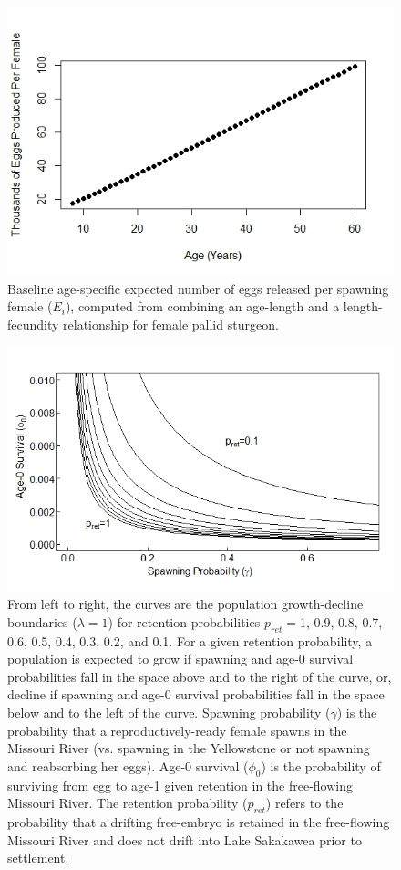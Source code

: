 \documentclass[12pt]{article}
\begin{document}
\begin{figure}[h]
\centering
\includegraphics[width=6in]{NEPA_fig_6-eggs}
\caption{Baseline age-specific expected number of eggs released per spawning female ($E_i$), computed from combining an age-length and a length-fecundity relationship for female pallid sturgeon.}
\end{figure}

\begin{figure}[h]
\centering
\includegraphics[width=6in]{NEPA_fig_7-growth-decline-space}
\caption{From left to right, the curves are the population growth-decline boundaries ($\lambda=1$) for retention probabilities $p_{ret}=$1, 0.9, 0.8, 0.7, 0.6, 0.5, 0.4, 0.3, 0.2, and 0.1.  For a given retention probability, a population is expected to grow if spawning and age-0 survival probabilities fall in the space above and to the right of the curve, or, decline if spawning and age-0 survival probabilities fall in the space below and to the left of the curve. Spawning probability ($\gamma$) is the probability that a reproductively-ready female spawns in the Missouri River (vs. spawning in the Yellowstone or not spawning and reabsorbing her eggs).  Age-0 survival ($\phi_0$) is the probability of surviving from egg to age-1 given retention in the free-flowing Missouri River.  The retention probability ($p_{ret}$) refers to the probability that a drifting free-embryo is retained in the free-flowing Missouri River and does not drift into Lake Sakakawea prior to settlement.}
\label{phi0-gamma-pret-space}
\end{figure}
\end{document}
